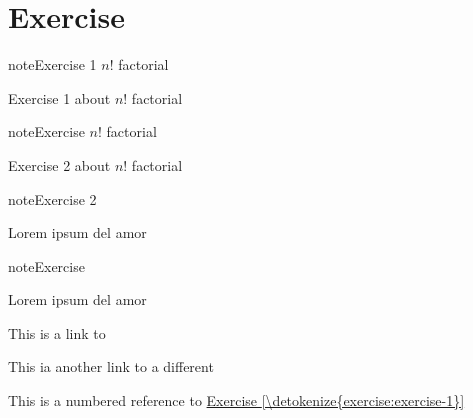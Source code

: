 

\pagestyle{empty}
\sphinxmaketitle
\pagestyle{plain}
\sphinxtableofcontents
\pagestyle{normal}
\label{\detokenize{index::doc}}



\chapter{Exercise}
\label{\detokenize{exercise:exercise}}\label{\detokenize{exercise::doc}} \label{exercise:exercise-1}
\begin{sphinxadmonition}{note}{Exercise 1 \(n!\) factorial}


\sphinxAtStartPar
Exercise 1 about \(n!\) factorial
\end{sphinxadmonition}
 \label{exercise:exercise-2}
\begin{sphinxadmonition}{note}{Exercise \(n!\) factorial}


\sphinxAtStartPar
Exercise 2 about \(n!\) factorial
\end{sphinxadmonition}
 \label{exercise:exercise-3}
\begin{sphinxadmonition}{note}{Exercise 2}


\sphinxAtStartPar
Lorem ipsum del amor
\end{sphinxadmonition}
 \label{exercise:exercise-4}
\begin{sphinxadmonition}{note}{Exercise}


\sphinxAtStartPar
Lorem ipsum del amor
\end{sphinxadmonition}

\sphinxAtStartPar
This is a link to {\hyperref[\detokenize{exercise:exercise-1}]{}}

\sphinxAtStartPar
This ia another link to a different {\hyperref[\detokenize{exercise:exercise-3}]{}}

\sphinxAtStartPar
This is a numbered reference to \hyperref[\detokenize{exercise:exercise-1}]{Exercise \ref{\detokenize{exercise:exercise-1}}}


